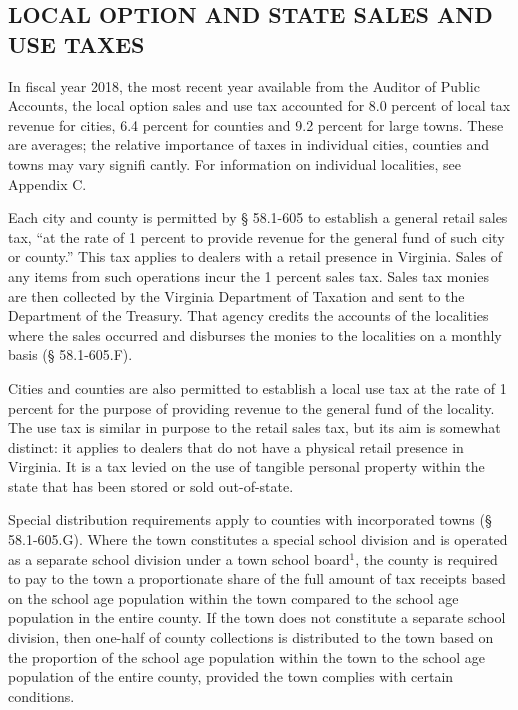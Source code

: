 \documentclass[
]{book}
\begin{document}
\hypertarget{local-option-and-state-sales-and-use-taxes}{%
\subsection{LOCAL OPTION AND STATE SALES AND USE TAXES}\label{local-option-and-state-sales-and-use-taxes}}

In fiscal year 2018, the most recent year available from the Auditor of Public Accounts, the local option sales and use tax accounted for 8.0 percent of local tax revenue for cities, 6.4 percent for counties and 9.2 percent for large towns. These are averages; the relative importance of taxes in individual cities, counties and towns may vary signifi cantly. For information on individual localities, see Appendix C.

Each city and county is permitted by § 58.1-605 to establish a general retail sales tax, ``at the rate of 1 percent to provide revenue for the general fund of such city or county.'' This tax applies to dealers with a retail presence in Virginia. Sales of any items from such operations incur the 1 percent sales tax. Sales tax monies are then collected by the Virginia Department of Taxation and sent to the Department of the Treasury. That agency credits the accounts of the localities where the sales occurred and disburses the monies to the localities on a monthly basis (§ 58.1-605.F).

Cities and counties are also permitted to establish a local use tax at the rate of 1 percent for the purpose of providing revenue to the general fund of the locality. The use tax is similar in purpose to the retail sales tax, but its aim is somewhat distinct: it applies to dealers that do not have a physical retail presence in Virginia. It is a tax levied on the use of tangible personal property within the state that has been stored or sold out-of-state.

Special distribution requirements apply to counties with incorporated towns (§ 58.1-605.G). Where the town constitutes a special school division and is operated as a separate school division under a town school board\(^1\), the county is required to pay to the town a proportionate share of the full amount of tax receipts based on the school age population within the town compared to the school age population in the entire county. If the town does not constitute a separate school division, then one-half of county collections is distributed to the town based on the proportion of the school age population within the town to the school age population of the entire county, provided the town complies with certain conditions.
\end{document}
